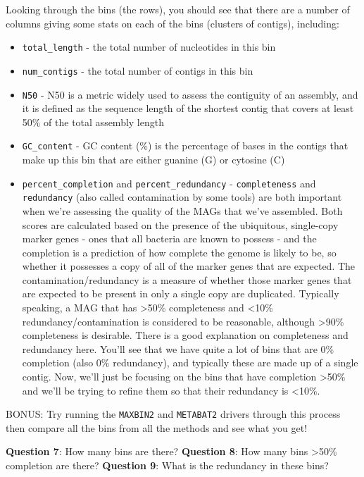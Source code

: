 \documentclass[
]{book}
\providecommand{\tightlist}{%
  \setlength{\itemsep}{0pt}\setlength{\parskip}{0pt}}
\begin{document}
Looking through the bins (the rows), you should see that there are a number of columns giving some stats on each of the bins (clusters of contigs), including:

\begin{itemize}
\tightlist
\item
  \texttt{total\_length} - the total number of nucleotides in this bin
\item
  \texttt{num\_contigs} - the total number of contigs in this bin
\item
  \texttt{N50} - N50 is a metric widely used to assess the contiguity of an assembly, and it is defined as the sequence length of the shortest contig that covers at least 50\% of the total assembly length
\item
  \texttt{GC\_content} - GC content (\%) is the percentage of bases in the contigs that make up this bin that are either guanine (G) or cytosine (C)
\item
  \texttt{percent\_completion} and \texttt{percent\_redundancy} - \texttt{completeness} and \texttt{redundancy} (also called contamination by some tools) are both important when we're assessing the quality of the MAGs that we've assembled. Both scores are calculated based on the presence of the ubiquitous, single-copy marker genes - ones that all bacteria are known to possess - and the completion is a prediction of how complete the genome is likely to be, so whether it possesses a copy of all of the marker genes that are expected. The contamination/redundancy is a measure of whether those marker genes that are expected to be present in only a single copy are duplicated. Typically speaking, a MAG that has \textgreater50\% completeness and \textless10\% redundancy/contamination is considered to be reasonable, although \textgreater90\% completeness is desirable. There is a good explanation on completeness and redundancy here.
  You'll see that we have quite a lot of bins that are 0\% completion (also 0\% redundancy), and typically these are made up of a single contig. Now, we'll just be focusing on the bins that have completion \textgreater50\% and we'll be trying to refine them so that their redundancy is \textless10\%.
\end{itemize}

BONUS: Try running the \texttt{MAXBIN2} and \texttt{METABAT2} drivers through this process then compare all the bins from all the methods and see what you get!

\textbf{Question 7}: How many bins are there?
\textbf{Question 8}: How many bins \textgreater50\% completion are there?
\textbf{Question 9}: What is the redundancy in these bins?
\end{document}
